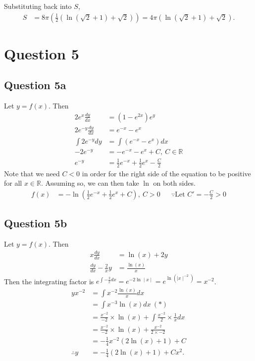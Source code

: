 \documentclass[12pt]{article}
\begin{document}
Substituting back into $S$,
\begin{align*}
    S &= 8\pi\left(\frac{1}{2}(\ln(\sqrt{2}+1)+\sqrt{2})\right)
    = 4\pi\left(\ln(\sqrt{2}+1)+\sqrt{2}\right).
\end{align*}

\newpage
\section*{Question 5}
\subsection*{Question 5a}
Let $y=f(x)$. Then
\begin{align*}
    2e^x\frac{dy}{dx} &= (1-e^{2x})e^y\\
    2e^{-y}\frac{dy}{dx} &= e^{-x}-e^x\\
    \int 2e^{-y}dy &= \int\left(e^{-x}-e^x\right)dx\\
    -2e^{-y} &= -e^{-x}-e^x + C,\:C\in\mathbb{R}\\
    e^{-y} &= \frac{1}{2}e^{-x}+\frac{1}{2}e^x -\frac{C}{2}
\end{align*}
Note that we need $C<0$ in order for the right side of the equation to be positive for all $x\in\mathbb{R}$. Assuming so, we can then take $\ln$ on both sides.
\begin{align*}
    f(x) &= -\ln\left(\frac{1}{2}e^{-x}+\frac{1}{2}e^x + C\right), \: C>0 && \because\text{Let } C'=-\frac{C}{2}>0
\end{align*}

\subsection*{Question 5b} 
Let $y=f(x).$ Then
\begin{align*}
    x\frac{dy}{dx} &= \ln(x)+2y\\
    \frac{dy}{dx} - \frac{2}{x}y &= \frac{\ln(x)}{x}
\end{align*}
Then the integrating factor is $e^{\int-\frac{2}{x}dx} = e^{-2\ln\mid x\mid}=e^{\ln(\mid x\mid^{-2})}=x^{-2}$.
\begin{align*}
    yx^{-2} &= \int x^{-2}\frac{\ln(x)}{x}dx\\
    &= \int x^{-3}\ln(x)dx\:(*)\\
    &= \frac{x^{-2}}{-2}\times\ln(x) + \int\frac{x^{-2}}{2}\times\frac{1}{x}dx\\
    &= \frac{x^{-2}}{-2}\times\ln(x) + \frac{x^{-2}}{2\times-2}\\
    &= -\frac{1}{4} x^{-2}\left(2\ln(x)+1\right)+C\\
    \therefore y &= -\frac{1}{4}(2\ln(x)+1)+Cx^2.
\end{align*}
\end{document}

